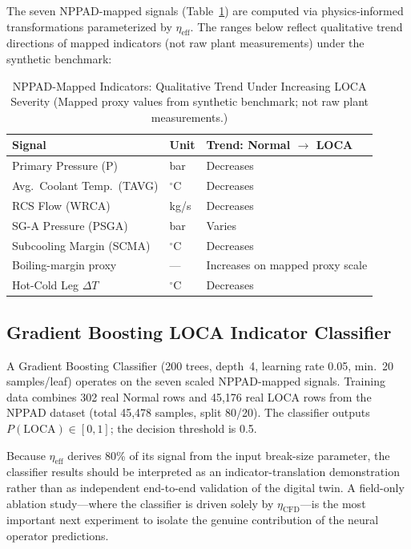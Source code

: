 \documentclass[conference]{IEEEtran}
\begin{document}
The seven NPPAD-mapped signals (Table~\ref{tab:nppad}) are computed via physics-informed transformations parameterized by $\eta_\text{eff}$. The ranges below reflect qualitative trend directions of mapped indicators (not raw plant measurements) under the synthetic benchmark:

\begin{table}[htbp]
\caption{NPPAD-Mapped Indicators: Qualitative Trend Under Increasing LOCA Severity (Mapped proxy values from synthetic benchmark; not raw plant measurements.)}
\label{tab:nppad}
\centering
\begin{tabular}{lll}
\toprule
\textbf{Signal} & \textbf{Unit} & \textbf{Trend: Normal $\to$ LOCA} \\
\midrule
Primary Pressure (P) & bar & Decreases \\
Avg.\ Coolant Temp.\ (TAVG) & $^\circ$C & Decreases \\
RCS Flow (WRCA) & kg/s & Decreases \\
SG-A Pressure (PSGA) & bar & Varies \\
Subcooling Margin (SCMA) & $^\circ$C & Decreases \\
Boiling-margin proxy & --- & Increases on mapped proxy scale \\
Hot-Cold Leg $\Delta T$ & $^\circ$C & Decreases \\
\bottomrule
\end{tabular}
\end{table}

\subsection{Gradient Boosting LOCA Indicator Classifier}

A Gradient Boosting Classifier (200 trees, depth~4, learning rate 0.05, min.\ 20 samples/leaf) operates on the seven scaled NPPAD-mapped signals. Training data combines 302 real Normal rows and 45,176 real LOCA rows from the NPPAD dataset (total 45,478 samples, split 80/20). The classifier outputs $P(\text{LOCA}) \in [0,1]$; the decision threshold is 0.5.

Because $\eta_\text{eff}$ derives 80\% of its signal from the input break-size parameter, the classifier results should be interpreted as an indicator-translation demonstration rather than as independent end-to-end validation of the digital twin. A field-only ablation study---where the classifier is driven solely by $\eta_\text{CFD}$---is the most important next experiment to isolate the genuine contribution of the neural operator predictions.
\end{document}

